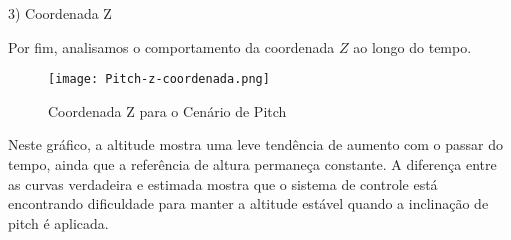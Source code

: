 3) Coordenada Z

Por fim, analisamos o comportamento da coordenada \(Z\) ao longo do tempo.

\begin{figure}[H]
	\centering
	\texttt{[image: Pitch-z-coordenada.png]}
	\caption{Coordenada Z para o Cenário de Pitch}
	\label{fig:pitch-z-coordenada}
\end{figure}

Neste gráfico, a altitude mostra uma leve tendência de aumento com o passar do tempo, ainda que a referência de altura permaneça constante. A diferença entre as curvas verdadeira e estimada mostra que o sistema de controle está encontrando dificuldade para manter a altitude estável quando a inclinação de pitch é aplicada.




\printindex
